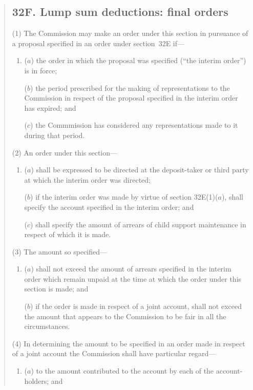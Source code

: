 \documentclass[12pt,a4paper]{article}
\begin{document}
\begin{quotation}
\subsection*{32F. Lump sum deductions: final orders}

(1) The Commission may make an order under this section in pursuance of a proposal specified in an order under section~32E if---
\begin{enumerate}\item[]
($a$)
the order in which the proposal was specified (“the interim order”) is in force;

($b$)
the period prescribed for the making of representations to the Commission in respect of the proposal specified in the interim order has expired; and

($c$)
the Commmission has considered any representations made to it during that period.
\end{enumerate}

(2) An order under this section---
\begin{enumerate}\item[]
($a$)
shall be expressed to be directed at the deposit-taker or third party at which the interim order was directed;

\begin{sloppypar}
($b$)
if the interim order was made by virtue of section 32E(1)($a$), shall specify the account specified in the interim order; and
\end{sloppypar}

($c$)
shall specify the amount of arrears of child support maintenance in respect of which it is made.
\end{enumerate}

(3) The amount so specified---
\begin{enumerate}\item[]
($a$) shall not exceed the amount of arrears specified in the interim order which remain unpaid at the time at which the order under this section is made; and

($b$) if the order is made in respect of a joint account, shall not exceed the amount that appears to the Commission to be fair in all the circumstances.
\end{enumerate}

(4)
In determining the amount to be specified in an order made in respect of a joint account the Commission shall have particular regard---
\begin{enumerate}\item[]
($a$) to the amount contributed to the account by each of the account-holders; and


\end{enumerate}
\end{quotation}
\end{document}
